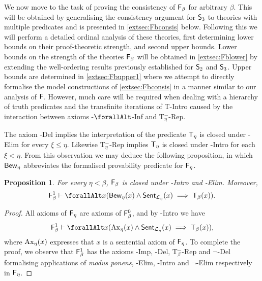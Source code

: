 \documentclass[UKenglish,cleveref,DIV=12]{scrartcl}
\let\forall\forallAlt
\newtheorem{proposition}[lemma]{Proposition}
\theoremstyle{definition}
\theoremstyle{definition}
\begin{document}
We now move to the task of proving the consistency of $\mathsf{F}_\beta$ for arbitrary
$\beta$. This will be obtained by generalising the consistency argument for
$\mathsf{S}_3$ to theories with multiple predicates and is presented in
\cref{extsec:Fbconsis} below. Following this we will perform a detailed ordinal
analysis of these theories, first determining lower bounds on their
proof-theoretic strength, and second upper bounds. Lower bounds on the strength
of the theories $\mathsf{F}_\beta$ will be obtained in \cref{extsec:Fblower} by
extending the well-ordering results previously established for $\mathsf{S}_2$ and
$\mathsf{S}_3$. Upper bounds are determined in \cref{extsec:Fbupper1} where we
attempt to directly formalise the model constructions of \cref{extsec:Fbconsis}
in a manner similar to our analysis of $\mathsf{F}$. However, much care will be required when
dealing with a hierarchy of truth predicates and the transfinite iterations of
T-Intro caused by the interaction between axioms \textT\eta-$\forall$-Inf and T$_\eta^-$-Rep.

The axiom \textT\eta-Del implies the interpretation of the predicate $\mathsf{T}_\eta$ is closed under \textT\xi-Elim for every $\xi\le\eta$. Likewise T$_\eta^-$-Rep implies $\mathsf{T}_\eta$ is closed under \textT\xi-Intro for each $\xi<\eta$. From this observation we may deduce the following proposition, in which $\mathsf{Bew}_\eta$ abbreviates the formalised provability predicate for $\mathsf{F}_\eta$.
\begin{proposition}\label{extprop:FFreflec}
 For every $\eta<\beta$, $\mathsf{F}_\beta$ is closed under \textT\eta-Intro and \textT\eta-Elim. Moreover, \[\F_\beta^1\proves \forall x( \Prov_{\eta}(x)\land\Sent_{\L_\eta}(x)\implies \T_\beta(x)).\]
\end{proposition}
\begin{proof}
All axioms of $\mathsf{F}_\eta$ are axioms of $\mathsf{F}_\beta^0$, and by \textT\beta-Intro we have
\begin{align*}
  \F_\beta^1\proves \forall x( \set{Ax}_{\eta}(x)\land\Sent_{\L_\eta}(x)\implies \T_\beta(x)),
\end{align*}
where $\mathrm{Ax}_\eta(x)$ expresses that $x$ is a sentential axiom of $\mathsf{F}_\eta$.
To complete the proof, we observe that $\mathsf{F}_\beta^1$ has the axioms
\textT\beta-Imp, \textT\beta-Del, T$_\beta^-$-Rep and $\lnot$\textT\beta-Del
formalising applications of {\em modus ponens}, \textT\eta-Elim, \textT\eta-Intro and $\lnot$\textT\eta-Elim respectively in $\mathsf{F}_\eta$.
\end{proof}
\end{document}
